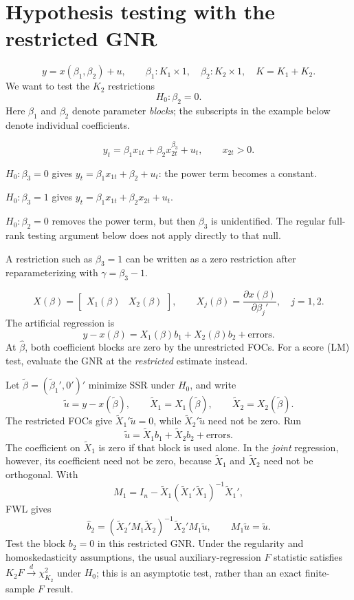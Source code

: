 \documentclass[11pt]{article}
\begin{document}
\section{Hypothesis testing with the restricted GNR}

\[ y=x(\beta_{1},\beta_{2})+u, \qquad
   \beta_{1}:K_{1}\times1,\quad \beta_{2}:K_{2}\times1,\quad K=K_{1}+K_{2}. \]
We want to test the $K_{2}$ restrictions
\[ H_{0}:\beta_{2}=0. \]
Here $\beta_{1}$ and $\beta_{2}$ denote parameter \emph{blocks}; the subscripts
in the example below denote individual coefficients.

\[ y_{t}=\beta_{1}x_{1t}+\beta_{2}x_{2t}^{\beta_{3}}+u_{t},
   \qquad x_{2t}>0. \]
\begin{flatlist}
 \item $H_{0}:\beta_{3}=0$ gives $y_{t}=\beta_{1}x_{1t}+\beta_{2}+u_{t}$:
       the power term becomes a constant.
 \item $H_{0}:\beta_{3}=1$ gives $y_{t}=\beta_{1}x_{1t}+\beta_{2}x_{2t}+u_{t}$.
 \item $H_{0}:\beta_{2}=0$ removes the power term, but then $\beta_{3}$ is
       unidentified. The regular full-rank testing argument below does not
       apply directly to that null.
\end{flatlist}
A restriction such as $\beta_{3}=1$ can be written as a zero restriction after
reparameterizing with $\gamma=\beta_{3}-1$.

\[ X(\beta)=\begin{bmatrix}X_{1}(\beta)&X_{2}(\beta)\end{bmatrix}, \qquad
   X_{j}(\beta)=\frac{\partial x(\beta)}{\partial\beta_{j}'},\quad j=1,2. \]
The artificial regression is
\[ y-x(\beta)=X_{1}(\beta)b_{1}+X_{2}(\beta)b_{2}+\text{errors}. \]
At $\hat\beta$, both coefficient blocks are zero by the unrestricted FOCs.
For a score (LM) test, evaluate the GNR at the \emph{restricted} estimate instead.

Let $\tilde\beta=(\tilde\beta_{1}',0')'$ minimize SSR under $H_{0}$, and write
\[ \tilde u=y-x(\tilde\beta), \qquad
   \tilde X_{1}=X_{1}(\tilde\beta), \qquad \tilde X_{2}=X_{2}(\tilde\beta). \]
The restricted FOCs give $\tilde X_{1}'\tilde u=0$, while
$\tilde X_{2}'\tilde u$ need not be zero. Run
\[ \tilde u=\tilde X_{1}b_{1}+\tilde X_{2}b_{2}+\text{errors}. \]
The coefficient on $\tilde X_{1}$ is zero if that block is used alone. In the
\emph{joint} regression, however, its coefficient need not be zero, because
$\tilde X_{1}$ and $\tilde X_{2}$ need not be orthogonal. With
\[ M_{1}=I_{n}-\tilde X_{1}(\tilde X_{1}'\tilde X_{1})^{-1}\tilde X_{1}', \]
FWL gives
\[ \hat b_{2}=(\tilde X_{2}'M_{1}\tilde X_{2})^{-1}\tilde X_{2}'M_{1}\tilde u,
   \qquad M_{1}\tilde u=\tilde u. \]
Test the block $b_{2}=0$ in this restricted GNR. Under the regularity and
homoskedasticity assumptions, the usual auxiliary-regression $F$ statistic
satisfies $K_{2}F\xrightarrow{d}\chi^{2}_{K_{2}}$ under $H_{0}$; this is an
asymptotic test, rather than an exact finite-sample $F$ result.
\end{document}
